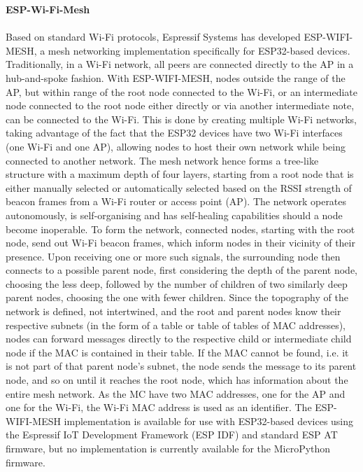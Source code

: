 \textbf{ESP-Wi-Fi-Mesh}\\\\
Based on standard Wi-Fi protocols, Espressif Systems has developed ESP-WIFI-MESH, a mesh networking implementation specifically for ESP32-based devices. Traditionally, in a Wi-Fi network, all peers are connected directly to the AP in a hub-and-spoke fashion. With ESP-WIFI-MESH, nodes outside the range of the AP, but within range of the root node connected to the Wi-Fi, or an intermediate node connected to the root node either directly or via another intermediate note, can be connected to the Wi-Fi. This is done by creating multiple Wi-Fi networks, taking advantage of the fact that the ESP32 devices have two Wi-Fi interfaces (one Wi-Fi and one AP), allowing nodes to host their own network while being connected to another network. The mesh network hence forms a tree-like structure with a maximum depth of four layers, starting from a root node that is either manually selected or automatically selected based on the RSSI strength of beacon frames from a Wi-Fi router or access point (AP). The network operates autonomously, is self-organising and has self-healing capabilities should a node become inoperable. To form the network, connected nodes, starting with the root node, send out Wi-Fi beacon frames, which inform nodes in their vicinity of their presence. Upon receiving one or more such signals, the surrounding node then connects to a possible parent node, first considering the depth of the parent node, choosing the less deep, followed by the number of children of two similarly deep parent nodes, choosing the one with fewer children. Since the topography of the network is defined, not intertwined, and the root and parent nodes know their respective subnets (in the form of a table or table of tables of MAC addresses), nodes can forward messages directly to the respective child or intermediate child node if the MAC is contained in their table. If the MAC cannot be found, i.e. it is not part of that parent node's subnet, the node sends the message to its parent node, and so on until it reaches the root node, which has information about the entire mesh network. As the MC have two MAC addresses, one for the AP and one for the Wi-Fi, the Wi-Fi MAC address is used as an identifier.
The ESP-WIFI-MESH implementation is available for use with ESP32-based devices using the Espressif IoT Development Framework (ESP IDF) and standard ESP AT firmware, but no implementation is currently available for the MicroPython firmware. \citep{espressif_systems_esp-wifi-mesh_nodate} \\

